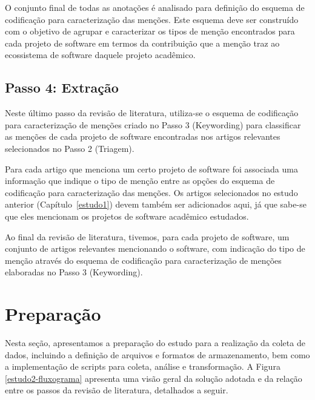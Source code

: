 O conjunto final de todas as anotações é analisado
para definição do esquema de codificação para caracterização das menções. 
Este esquema deve ser construído com o objetivo de agrupar e caracterizar os tipos
de menção encontrados para cada projeto de software em termos da contribuição
que a menção traz ao ecossistema de software daquele projeto acadêmico.

\subsection{Passo 4: Extração}

Neste último passo da revisão de literatura, utiliza-se o esquema de codificação
para caracterização de menções criado no Passo 3 (Keywording) para classificar as
menções de cada projeto de software encontradas nos artigos relevantes
selecionados no Passo 2 (Triagem).

Para cada artigo que menciona um certo projeto de software foi associada uma
informação que indique o tipo de menção entre as opções do esquema de
codificação para caracterização das menções. Os artigos selecionados no estudo
anterior (Capítulo~\ref{estudo1}) devem também ser adicionados aqui, já que
sabe-se que eles mencionam os projetos de software acadêmico estudados.

Ao final da revisão de literatura, tivemos, para cada projeto de software, um
conjunto de artigos relevantes mencionando o software, com indicação do tipo de menção
através do esquema de codificação para caracterização de menções elaboradas no Passo 3 (Keywording).


\section{Preparação} \label{estudo2:preparacao} %

Nesta seção, apresentamos a preparação do estudo para a realização da coleta de
dados, incluindo a definição de arquivos e formatos de armazenamento, bem como
a implementação de scripts para coleta, análise e transformação.
A Figura \ref{estudo2-fluxograma} apresenta uma visão geral da solução adotada
e da relação entre os passos da revisão de literatura, detalhados a seguir.

